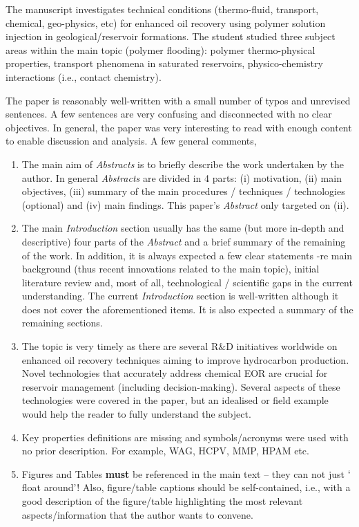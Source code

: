 \documentclass[14pt,twoside]{report}
\begin{document}
\medskip

The manuscript investigates technical conditions (thermo-fluid, transport, chemical, geo-physics, etc) for enhanced oil recovery using polymer solution injection in geological/reservoir formations.  The student studied three subject areas within the main topic (polymer flooding): polymer thermo-physical properties, transport phenomena in saturated reservoirs, physico-chemistry interactions (i.e., contact chemistry).

The paper is reasonably well-written with a small number of typos and unrevised sentences. A few sentences are very confusing and disconnected with no clear objectives. In general, the paper was very interesting to read with enough content to enable discussion and analysis. A few general comments,
\begin{enumerate}
\item The main aim of {\it Abstracts} is to briefly describe the work undertaken by the author. In general {\it Abstracts} are divided in 4 parts: (i) motivation, (ii) main objectives, (iii) summary of the main procedures / techniques / technologies (optional) and (iv) main findings. This paper's {\it Abstract} only targeted on (ii).
%
\item The main {\it Introduction} section usually has the same (but more in-depth and descriptive) four parts of the {\it Abstract} and a brief summary of the remaining of the work. In addition, it is always expected a few clear statements -re main background (thus recent innovations related to the main topic), initial literature review and, most of all, technological / scientific gaps in the current understanding. The current {\it Introduction} section is well-written although it does not cover the aforementioned items. It is also expected a summary of the remaining sections. 
%
\item The topic is very timely as there are several R$\&$D initiatives worldwide on enhanced oil recovery techniques aiming to improve hydrocarbon production. Novel technologies that accurately address chemical EOR are crucial for reservoir management (including decision-making). Several aspects of these technologies were covered in the paper, but an idealised or field example would help the reader to fully understand the subject.
%
\item Key properties definitions are missing and symbols/acronyms were used with no prior description. For example, WAG, HCPV, MMP, HPAM etc.
%
\item Figures and Tables {\bf must} be referenced in the main text -- they can not just $\lq$float around'! Also, figure/table captions should be self-contained, i.e., with a good description of the figure/table highlighting the most relevant aspects/information that the author wants to convene. 

\end{enumerate}
\end{document}
